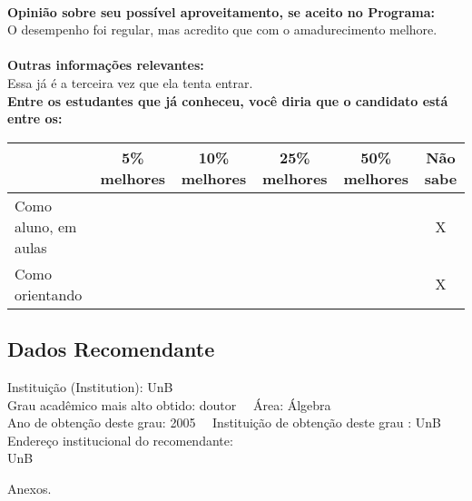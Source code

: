 \documentclass[11pt]{article}
\begin{document}
\\
\textbf{Opinião sobre seu possível aproveitamento, se aceito no Programa:}
\\O desempenho foi regular, mas acredito que com o amadurecimento melhore.\\ 
\\
\textbf{Outras informações relevantes:} \\Essa já é a terceira vez que ela tenta entrar.
\\[0.3cm]
\textbf{Entre os estudantes que já conheceu, você diria que o candidato está entre os:}
\\
\begin{tabular}{|l|c|c|c|c|c|}
\hline
 & 5\% melhores & 10\% melhores & 25\% melhores & 50\% melhores & Não sabe \\
\hline
Como aluno, em aulas &  &  &  &  & X\\
\hline
Como orientando &  &  &  &  & X\\
\hline
\end{tabular}
\subsection*{Dados Recomendante} 
	Instituição (Institution): UnB
\\ 
	Grau acadêmico mais alto obtido: doutor
	\ \ Área: Álgebra
	\\
	Ano de obtenção deste grau: 2005
	\ \ 
	Instituição de obtenção deste grau : UnB
	\\ 
	Endereço institucional do recomendante: \\ UnB 
\begin{center}
Anexos.
\end{center}
\end{document}
